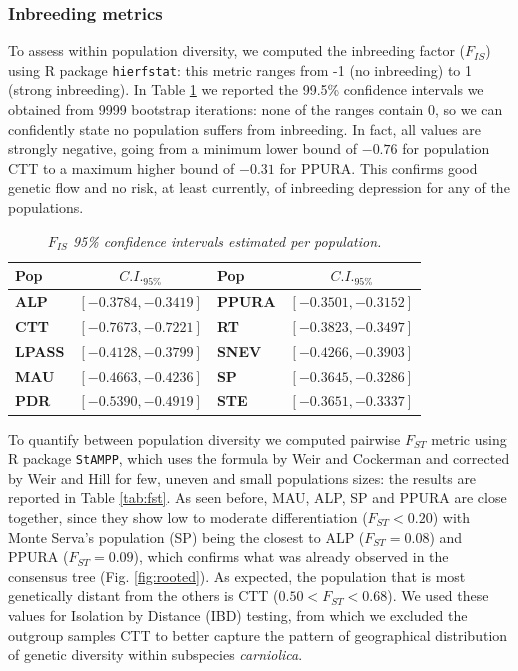 \documentclass[a4paper, 12pt]{report}
\begin{document}
\subsubsection{Inbreeding metrics}
To assess within population diversity, we computed the inbreeding factor ($F_{IS}$) using R package \texttt{hierfstat}: this metric ranges from -1 (no inbreeding) to 1 (strong inbreeding). In Table \ref{tab:fis} we reported the 99.5\% confidence intervals we obtained from 9999 bootstrap iterations: none of the ranges contain 0, so we can confidently state no population suffers from inbreeding. In fact, all values are strongly negative, going from a minimum lower bound of $-0.76$ for population CTT to a maximum higher bound of $-0.31$ for PPURA. This confirms good genetic flow and no risk, at least currently, of inbreeding depression for any of the populations.

\begin{table}[h!]
	\centering
	\caption{\textbf{$F_{IS}$ 99.5\% confidence intervals for each population.}}
	\label{tab:fis}
	\begin{tabular}{lclc}
		\toprule
		\textbf{Pop} & \textbf{$C.I._{95\%}$} & \textbf{Pop} & \textbf{$C.I._{95\%}$} \\
		\midrule
		\textbf{ALP}   & $[-0.3784, -0.3419]$ & \textbf{PPURA} & $[-0.3501, -0.3152]$ \\
		\textbf{CTT}   & $[-0.7673, -0.7221]$ & \textbf{RT}    & $[-0.3823, -0.3497]$ \\
		\textbf{LPASS} & $[-0.4128, -0.3799]$ & \textbf{SNEV}  & $[-0.4266, -0.3903]$ \\
		\textbf{MAU}   & $[-0.4663, -0.4236]$ & \textbf{SP}    & $[-0.3645, -0.3286]$ \\
		\textbf{PDR}   & $[-0.5390, -0.4919]$ & \textbf{STE}   & $[-0.3651, -0.3337]$ \\
		\bottomrule
	\end{tabular}
	\caption*{\footnotesize{\textit{$F_{IS}$ 95\% confidence intervals estimated per population.}}}
\end{table}

To quantify between population diversity we computed pairwise $F_{ST}$ metric using R package \texttt{StAMPP}, which uses the formula by Weir and Cockerman \cite{weirEstimatingFStatisticsAnalysis1984} and corrected by Weir and Hill \cite{weirEstimatingFStatistics2002} for few, uneven and small populations sizes: the results are reported in Table \ref{tab:fst}. As seen before, MAU, ALP, SP and PPURA are close together, since they show low to moderate differentiation ($F_{ST} < 0.20$) with Monte Serva's population (SP) being the closest to ALP ($F_{ST} = 0.08$) and PPURA ($F_{ST} = 0.09$), which confirms what was already observed in the consensus tree (Fig. \ref{fig:rooted}). As expected, the population that is most genetically distant from the others is CTT ($0.50 < F_{ST} < 0.68$). We used these values for Isolation by Distance (IBD) testing, from which we excluded the outgroup samples CTT to better capture the pattern of geographical distribution of genetic diversity within subspecies \textit{carniolica}. 
\end{document}
